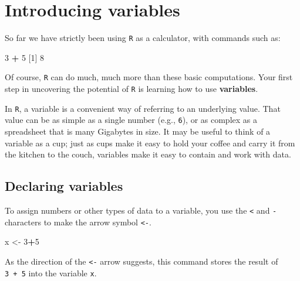 \documentclass[
]{book}
\newenvironment{Shaded}{\begin{snugshade}}{\end{snugshade}}
\newcommand{\DecValTok}[1]{\textcolor[rgb]{0.00,0.00,0.81}{#1}}
\newcommand{\NormalTok}[1]{#1}
\newcommand{\OperatorTok}[1]{\textcolor[rgb]{0.81,0.36,0.00}{\textbf{#1}}}
\newcommand{\StringTok}[1]{\textcolor[rgb]{0.31,0.60,0.02}{#1}}
\begin{document}
\hypertarget{introducing-variables}{%
\section*{Introducing variables}\label{introducing-variables}}

So far we have strictly been using \texttt{R} as a calculator, with commands such as:

\begin{Shaded}
\begin{Highlighting}[]
\DecValTok{3} \OperatorTok{+}\StringTok{ }\DecValTok{5}
\NormalTok{[}\DecValTok{1}\NormalTok{] }\DecValTok{8}
\end{Highlighting}
\end{Shaded}

Of course, \texttt{R} can do much, much more than these basic computations. Your first step in uncovering the potential of \texttt{R} is learning how to use \textbf{variables}.

In \texttt{R}, a variable is a convenient way of referring to an underlying value. That value can be as simple as a single number (e.g., \texttt{6}), or as complex as a spreadsheet that is many Gigabytes in size. It may be useful to think of a variable as a cup; just as cups make it easy to hold your coffee and carry it from the kitchen to the couch, variables make it easy to contain and work with data.

\hypertarget{declaring-variables}{%
\subsection*{Declaring variables}\label{declaring-variables}}

To assign numbers or other types of data to a variable, you use the \texttt{\textless{}} and \texttt{-} characters to make the arrow symbol \texttt{\textless{}-}.

\begin{Shaded}
\begin{Highlighting}[]
\NormalTok{x <-}\StringTok{ }\DecValTok{3}\OperatorTok{+}\DecValTok{5}
\end{Highlighting}
\end{Shaded}

As the direction of the \texttt{\textless{}-} arrow suggests, this command stores the result of \texttt{3\ +\ 5} into the variable \texttt{x}.
\end{document}
